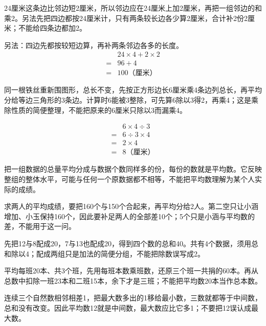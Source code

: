 \documentclass[multi=snippet,border=0pt]{standalone}
\newenvironment{snippet}[3]{\begin{minipage}{#1bp}\color{answerred}\fontsize{#2}{#3}\selectfont\raggedright}{\end{minipage}}
\begin{document}
\begin{snippet}{505}{11.5}{14}24厘米这条边比邻边短2厘米，所以邻边应在24厘米上加2厘米，再把一组邻边的和乘2。另法先把四边都按24厘米计，只有两条较长边各少算2厘米，合计补2份2厘米；不能给四条边都加2。\par 另法：四边先都按较短边算，再补两条邻边各多的长度。\[\begin{aligned}&24\times4+2\times2\\={}&96+4\\={}&100\text{（厘米）}\end{aligned}\]\end{snippet}
\begin{snippet}{505}{11.5}{14}同一根铁丝重新围图形，总长不变，先按正方形边长6厘米乘4条边列总长，再平均分给等边三角形的3条边。计算时6能被3整除，可先算6除以3得2，再乘4；这是乘除性质的简便整理，不能把原来的6厘米只除以3而漏乘4。\end{snippet}
\begin{snippet}{319}{10.5}{12.8}\[\begin{aligned}&6\times4\div3\\={}&6\div3\times4\\={}&2\times4\\={}&8\text{（厘米）}\end{aligned}\]\end{snippet}
\begin{snippet}{505}{11.5}{14}把一组数据的总量平均分成与数据个数同样多的份，每份的数就是平均数。它反映整组的整体水平，可能与任何一个原数据都不相等，不能把平均数理解为某个人实际的成绩。\end{snippet}
\begin{snippet}{505}{11.5}{14}求两人的平均成绩，要把160个与150个合起来，再平均分给2人。第二空只让小涵增加、小玉保持160个，因此要补足两人的全部差10个；5个只是小涵与平均数的差，不能用于这一问。\end{snippet}
\begin{snippet}{505}{11.5}{14}先把12与8配成20，7与13也配成20，得到四个数的总和40。共有4个数据，须用总和除以4；配成两组只是加法的简便分组，不能把除数误写成2。\end{snippet}
\begin{snippet}{505}{11.5}{14}平均每班20本、共3个班，先用每班本数乘班数，还原三个班一共捐的60本。再从总数中扣除一班23本和二班15本，余下才是三班；不能把平均数20本当作总本数。\end{snippet}
\begin{snippet}{505}{11.5}{14}连续三个自然数相邻相差1，把最大数多出的1移给最小数，三数就都等于中间数，总和没有改变。因此平均数12就是中间数，最大数应比它多1；不要把12误认成最大数。\end{snippet}
\end{document}
